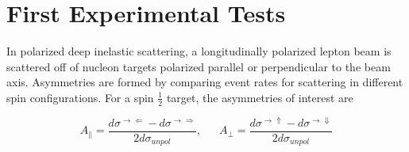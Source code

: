 \section{First Experimental Tests}

In polarized deep inelastic scattering, a longitudinally polarized lepton beam is scattered off of nucleon targets polarized parallel or perpendicular to the beam axis. Asymmetries are formed by comparing event rates for scattering in different spin configurations.  For a spin $\frac{1}{2}$ target, the asymmetries of interest are

\begin{equation}
  A_{\parallel} = \frac{d\sigma^{\rightarrow \Leftarrow} - d\sigma^{\rightarrow \Rightarrow}}{2d\sigma_{unpol}}, ~~~~~~~
  A_{\perp} = \frac{d\sigma^{\rightarrow \Uparrow} - d\sigma^{\rightarrow \Downarrow}}{2d\sigma_{unpol}}
\end{equation}


